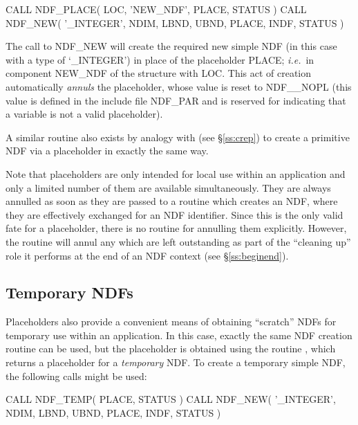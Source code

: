 \documentclass[twoside,11pt,nolof]{starlink}
\providecommand{\st}[1]{{\emph{#1}}}
\begin{document}
\small
\begin{terminalv}
      CALL NDF_PLACE( LOC, 'NEW_NDF', PLACE, STATUS )
      CALL NDF_NEW( '_INTEGER', NDIM, LBND, UBND, PLACE, INDF, STATUS )
\end{terminalv}
\normalsize

The call to NDF\_NEW will create the required new simple NDF (in this case
with a type of `\_INTEGER') in place of the placeholder PLACE; \st{i.e.}\ in
component NEW\_NDF of the  structure with
 LOC.
This act of creation automatically \st{annuls\/} the placeholder, whose value
is reset to NDF\_\_NOPL (this value is defined in the include file NDF\_PAR
and is reserved for indicating that a variable is not a valid placeholder).

A similar routine  also exists by analogy with  (see
\S\ref{ss:crep}) to create a primitive NDF via a placeholder in exactly the
same way.

Note that placeholders are only intended for local use within an
application and only a limited number of them are available simultaneously.
They are always annulled as soon as they are passed to a routine which
creates an NDF, where they are effectively exchanged for an NDF identifier.
Since this is the only valid fate for a placeholder, there is no routine for
annulling them explicitly.
However, the routine  will annul any which are left outstanding as
part of the ``cleaning up'' role it performs at the end of an NDF context
(see \S\ref{ss:beginend}).

\subsection{Temporary NDFs}

Placeholders also provide a convenient means of obtaining ``scratch'' NDFs
for temporary use within an application.
In this case, exactly the same NDF creation routine can be used, but the
placeholder is obtained using the routine , which returns a
placeholder for a \st{temporary\/} NDF.
To create a temporary simple NDF, the following calls might be used:

\small
\begin{terminalv}
      CALL NDF_TEMP( PLACE, STATUS )
      CALL NDF_NEW( '_INTEGER', NDIM, LBND, UBND, PLACE, INDF, STATUS )
\end{terminalv}
\normalsize
\end{document}
